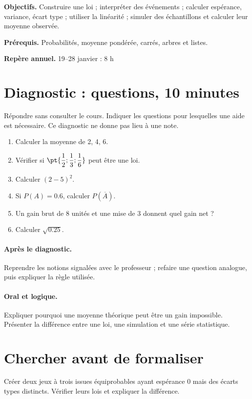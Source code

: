 \label{C08}
\begin{keypoint}
\textbf{Objectifs.} Construire une loi ; interpréter des événements ; calculer espérance, variance, écart type ; utiliser la linéarité ; simuler des échantillons et calculer leur moyenne observée.

\textbf{Prérequis.} Probabilités, moyenne pondérée, carrés, arbres et listes.

\textbf{Repère annuel.} 19–28 janvier : 8 h\end{keypoint}
\section*{Diagnostic :  questions, 10 minutes}\label{C08-D}
Répondre sans consulter le cours. Indiquer les questions pour lesquelles une aide est nécessaire. Ce diagnostic ne donne pas lieu à une note.
\begin{enumerate}
\item Calculer la moyenne de 2, 4, 6.
\item Vérifier si $\pt{\dfrac{1}{2};\dfrac{1}{3};\dfrac{1}{6}}$ peut être une loi.
\item Calculer $(2-5)^2$.
\item Si $P(A)=\num{0,6}$, calculer $P(\overline A)$.
\item Un gain brut de 8 unités et une mise de 3 donnent quel gain net ?
\item Calculer $\sqrt{\num{0,25}}$.
\end{enumerate}
\paragraph{Après le diagnostic.} Reprendre les notions signalées avec le professeur ; refaire une question analogue, puis expliquer la règle utilisée.
\paragraph{Oral et logique.} Expliquer pourquoi une moyenne théorique peut être un gain impossible. Présenter la différence entre une loi, une simulation et une série statistique.
\mxnewpage
\section*{Chercher avant de formaliser}\label{C08-RECH}
Créer deux jeux à trois issues équiprobables ayant espérance 0 mais des écarts types distincts. Vérifier leurs lois et expliquer la différence.
